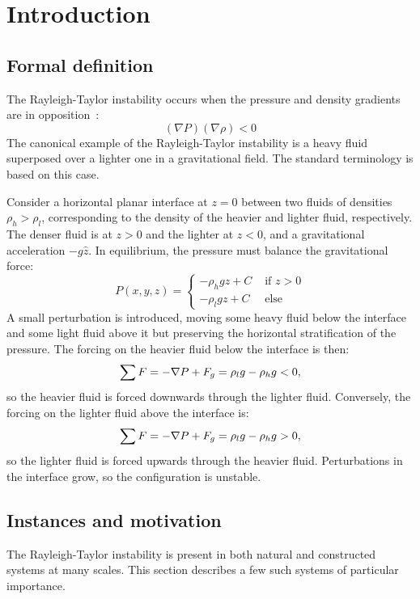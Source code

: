 \chapter{Introduction}

\section{Formal definition}
The Rayleigh-Taylor instability occurs when the pressure and density gradients are in opposition~\cite{Sharp1984}:
\begin{equation}
(\nabla P)(\nabla \rho) < 0
\end{equation}
The canonical example of the Rayleigh-Taylor instability is a heavy fluid superposed over a lighter one in a gravitational field.
The standard terminology is based on this case.

Consider a horizontal planar interface at $z=0$ between two fluids of densities $\rho_h > \rho_l$, corresponding to the density of the heavier and lighter fluid, respectively.
The denser fluid is at $z > 0$ and the lighter at $z < 0$, and a gravitational acceleration $-g \hat{z}$.
In equilibrium, the pressure must balance the gravitational force:
\begin{equation}
P(x,y,z) = \begin{cases}- \rho_h g z + C& \text{ if } z > 0 \\
                        - \rho_l g z + C& \text{ else}
           \end{cases}
\end{equation}
A small perturbation is introduced, moving some heavy fluid below the interface and some light fluid above it but preserving the horizontal stratification of the pressure.
The forcing on the heavier fluid below the interface is then:
\begin{equation}\elabel{force1}
\sum F = - \nabla P + F_g = \rho_l g  - \rho_h g < 0,
\end{equation}
so the heavier fluid is forced downwards through the lighter fluid.
Conversely, the forcing on the lighter fluid above the interface is:
\begin{equation} \elabel{force2}
\sum F = - \nabla P + F_g = \rho_l g  - \rho_h g > 0,
\end{equation}
so the lighter fluid is forced upwards through the heavier fluid.
Perturbations in the interface grow, so the configuration is unstable.

\section{Instances and motivation}
The Rayleigh-Taylor instability is present in both natural and constructed systems at many scales.
This section describes a few such systems of particular importance.

